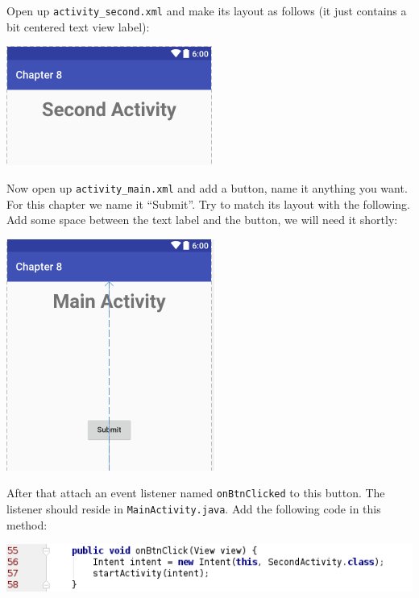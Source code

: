 Open up \texttt{activity\_second.xml} and make its layout as follows (it just contains a bit centered text view label):

\begin{center}
	\includegraphics[scale=0.4]{chapters/ch08/images/6}
\end{center}

Now open up \texttt{activity\_main.xml} and add a button, name it anything you want. For this chapter we name it ``Submit''. Try to match its layout with the following. Add some space between the text label and the button, we will need it shortly: 

\begin{center}
	\includegraphics[scale=0.4]{chapters/ch08/images/7}
\end{center}

After that attach an event listener named \texttt{onBtnClicked} to this button. The listener should reside in \texttt{MainActivity.java}. Add the following code in this method:

\begin{center}
	\includegraphics[scale=0.4]{chapters/ch08/images/8}
\end{center}


